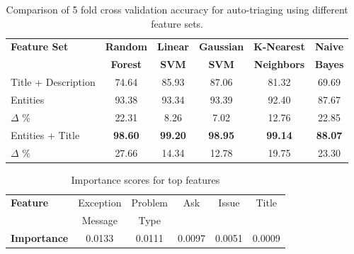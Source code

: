 \begin{table}
\small
    \begin{center}
    \caption{Comparison of 5 fold cross validation accuracy for auto-triaging using different feature sets.}
    \label{tab:auto-triaging-models}
    \vspace{-6pt}
    \setlength\tabcolsep{2 pt}
    \begin{tabular}{@{}p{2.66cm}ccccc@{}}
        \toprule
         
        \textbf{Feature Set}  & \textbf{Random} & \textbf{Linear} & \textbf{Gaussian} &  \textbf{K-Nearest} & \textbf{Naive} \\[-2pt]
         & \textbf{Forest} & \textbf{SVM} & \textbf{SVM} & \textbf{Neighbors} & \textbf{Bayes}\\
        \midrule
        Title + Description & 74.64 & 85.93 & 87.06 & 81.32 & 69.69 \\
        \midrule
        \softner{} Entities & 93.38 & 93.34 & 93.39 & 92.40 & 87.67\\
        $\Delta$ \% & 22.31 & 8.26 & 7.02 & 12.76 & 22.85 \\
        \midrule
        \softner{} Entities + Title & \textbf{98.60} & \textbf{99.20} & \textbf{98.95} & \textbf{99.14} & \textbf{88.07} \\
        $\Delta$ \% & 27.66 & 14.34 & 12.78 & 19.75 & 23.30 \\
        
        \bottomrule
    \end{tabular}
    \end{center}
\vspace{-6pt}
\end{table}



\begin{table}[H]
\vspace{-6pt}
\small\centering
    \caption{Importance scores for top features}
    \label{tab:feature_significance}
    \vspace{-6pt}
    \setlength\tabcolsep{2 pt}
    \begin{tabular}{lccccc}
        \toprule
        \textbf{Feature}  & Exception & Problem & Ask &  Issue & Title \\[-3pt]
        & Message & Type & & \\
        \midrule
        \textbf{Importance} & 0.0133 & 0.0111 & 0.0097 & 0.0051 & 0.0009\\
        \bottomrule
    \end{tabular}
\vspace{-6pt}
\end{table}